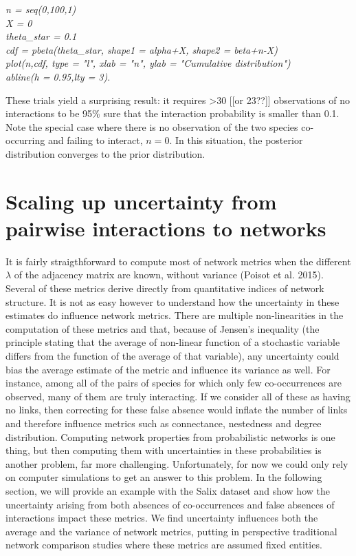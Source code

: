 \documentclass[12pt]{article}
\begin{document}
  \vspace{12pt}
\noindent\emph{
    \noindent n = seq(0,100,1)
    \\\noindent X = 0
    \\\noindent theta\_star = 0.1
    \\\noindent cdf = pbeta(theta\_star, shape1 = alpha+X, shape2 = beta+n-X)
    \\\noindent plot(n,cdf, type = "l", xlab = "n", ylab = "Cumulative distribution")
    \\\noindent abline(h = 0.95,lty = 3)}.
  \vspace{12pt}


These trials yield a surprising result: it requires \textgreater30 [[or 23??]] observations of no interactions to be 95\% sure that the interaction probability is smaller than 0.1. Note the special case where there is no observation of the two species co-occurring and failing to interact, $n = 0$. In this situation, the posterior distribution converges to the prior distribution. 



\section*{Scaling up uncertainty from pairwise interactions to networks}

It is fairly straigthforward to compute most of network metrics when the different $\lambda$ of the adjacency matrix are known, without variance (Poisot et al. 2015). Several of these metrics derive directly from quantitative indices of network structure. It is not as easy however to understand how the uncertainty in these estimates do influence network metrics. There are multiple non-linearities in the computation of these metrics and that, because of Jensen's inequality (the principle stating that the average of non-linear function of a stochastic variable differs from the function of the average of that variable), any uncertainty could bias the average estimate of the metric and influence its variance as well. For instance, among all of the pairs of species for which only few co-occurrences are observed, many of them are truly interacting. If we consider all of these as having no links, then correcting for these false absence would inflate the number of links and therefore influence metrics such as connectance, nestedness and degree distribution. Computing network properties from probabilistic networks is one thing, but then computing them with uncertainties in these probabilities is another problem, far more challenging. Unfortunately, for now we could only rely on computer simulations to get an answer to this problem. In the following section, we will provide an example with the Salix dataset and show how the uncertainty arising from both absences of co-occurrences and false absences of interactions impact these metrics. We find uncertainty influences both the average and the variance of network metrics, putting in perspective traditional network comparison studies where these metrics are assumed fixed entities. 
\end{document}
